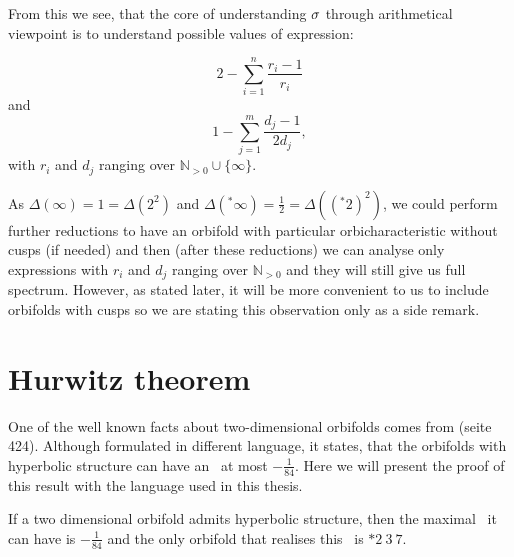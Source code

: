 From this we see, that the core of understanding ${\sigma}$ through arithmetical viewpoint 
is to understand possible values of expression:

\begin{equation}\label{S2_sum}
2 - \sum_{i=1}^n \frac{r_i-1}{r_i}
\end{equation}
and 
\begin{equation}\label{D2_sum}
1 - \sum_{j=1}^m \frac{d_j-1}{2d_j},
\end{equation}
with $r_i$ and $d_j$ ranging over $\mathbb{N}_{>0}\cup \{\infty\}$.

As $\Delta(\infty) = 1 = \Delta(2^2)$ and $\Delta(^*\infty) = \frac{1}{2} = \Delta((^*2)^2)$, 
we could perform further reductions to have an orbifold with 
particular orbicharacteristic without cusps (if needed) and then (after these reductions) 
we can analyse only expressions with $r_i$ and $d_j$ ranging over $\mathbb{N}_{>0}$ and 
they will still give us full spectrum. 
However, as stated later, it will be more convenient to us to include orbifolds with cusps 
so we are stating this observation only as a side remark.

\section{Hurwitz theorem}\label{największy orbifold}
One of the well known facts about two-dimensional orbifolds comes from \cite{Hurwitz1893} 
(seite 424).
Although formulated in different language, it states, that the orbifolds 
with hyperbolic structure can have an \Eoc\ at most $-\frac{1}{84}$. 
Here we will present the proof of this result with the language used in this thesis.
\begin{theorem}
If a two dimensional orbifold admits hyperbolic structure, then the maximal \Eoc\ it can 
have is $-\frac{1}{84}$ and the only orbifold that realises this \Eoc\ is $*2\ 3\ 7$.
\end{theorem}
